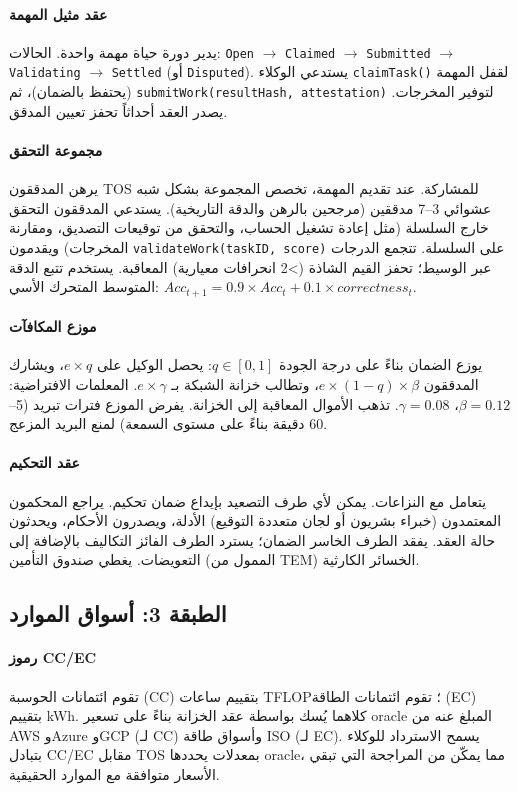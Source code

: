 \documentclass[11pt]{article}
\begin{document}
\paragraph{عقد مثيل المهمة} يدير دورة حياة مهمة واحدة. الحالات: \texttt{Open} $\rightarrow$ \texttt{Claimed} $\rightarrow$ \texttt{Submitted} $\rightarrow$ \texttt{Validating} $\rightarrow$ \texttt{Settled} (أو \texttt{Disputed}). يستدعي الوكلاء \texttt{claimTask()} لقفل المهمة (يحتفظ بالضمان)، ثم \texttt{submitWork(resultHash, attestation)} لتوفير المخرجات. يصدر العقد أحداثاً تحفز تعيين المدقق.

\paragraph{مجموعة التحقق} يرهن المدققون TOS للمشاركة. عند تقديم المهمة، تخصص المجموعة بشكل شبه عشوائي 3--7 مدققين (مرجحين بالرهن والدقة التاريخية). يستدعي المدققون التحقق خارج السلسلة (مثل إعادة تشغيل الحساب، والتحقق من توقيعات التصديق، ومقارنة المخرجات) ويقدمون \texttt{validateWork(taskID, score)} على السلسلة. تتجمع الدرجات عبر الوسيط؛ تحفز القيم الشاذة (>2 انحرافات معيارية) المعاقبة. يستخدم تتبع الدقة المتوسط المتحرك الأسي: $Acc_{t+1} = 0.9 \times Acc_t + 0.1 \times correctness_t$.

\paragraph{موزع المكافآت} يوزع الضمان بناءً على درجة الجودة $q \in [0,1]$: يحصل الوكيل على $e \times q$، ويشارك المدققون $e \times (1-q) \times \beta$، وتطالب خزانة الشبكة بـ $e \times \gamma$. المعلمات الافتراضية: $\beta=0.12$، $\gamma=0.08$. تذهب الأموال المعاقبة إلى الخزانة. يفرض الموزع فترات تبريد (5--60 دقيقة بناءً على مستوى السمعة) لمنع البريد المزعج.

\paragraph{عقد التحكيم} يتعامل مع النزاعات. يمكن لأي طرف التصعيد بإيداع ضمان تحكيم. يراجع المحكمون المعتمدون (خبراء بشريون أو لجان متعددة التوقيع) الأدلة، ويصدرون الأحكام، ويحدثون حالة العقد. يفقد الطرف الخاسر الضمان؛ يسترد الطرف الفائز التكاليف بالإضافة إلى التعويضات. يغطي صندوق التأمين (الممول من TEM) الخسائر الكارثية.

\subsection{الطبقة 3: أسواق الموارد}
\paragraph{رموز CC/EC} تقوم ائتمانات الحوسبة (CC) بتقييم ساعات TFLOP؛ تقوم ائتمانات الطاقة (EC) بتقييم kWh. كلاهما يُسك بواسطة عقد الخزانة بناءً على تسعير oracle المبلغ عنه من AWS وAzure وGCP (لـ CC) وأسواق طاقة ISO (لـ EC). يسمح الاسترداد للوكلاء بتبادل CC/EC مقابل TOS بمعدلات يحددها oracle، مما يمكّن من المراجحة التي تبقي الأسعار متوافقة مع الموارد الحقيقية.
\end{document}
